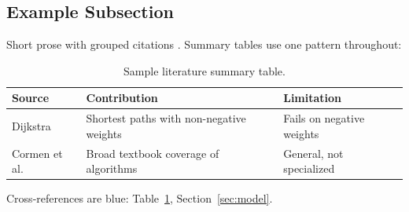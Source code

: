 \subsection{Example Subsection}
Short prose with grouped citations \cite{dijkstra1959note, cormen2009introduction}. Summary tables use one pattern throughout:

\begin{table}[H]
\centering
\caption{Sample literature summary table.}\label{tab:rrl}
\vspace{4pt}
\begin{tabularx}{\textwidth}{l X X}
\toprule
\textbf{Source} & \textbf{Contribution} & \textbf{Limitation}\\
\midrule
Dijkstra \cite{dijkstra1959note} & Shortest paths with non-negative weights & Fails on negative weights\\
Cormen et al. \cite{cormen2009introduction} & Broad textbook coverage of algorithms & General, not specialized\\
\bottomrule
\end{tabularx}
\end{table}

Cross-references are blue: Table~\ref{tab:rrl}, Section~\ref{sec:model}.
